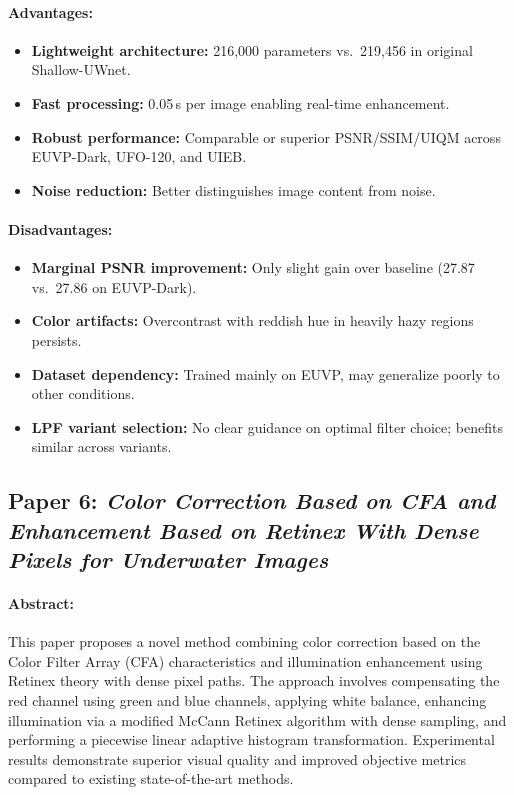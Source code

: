 \documentclass{article}
\begin{document}
\paragraph{Advantages:}
\begin{itemize}
    \item \textbf{Lightweight architecture:} 216,000 parameters vs.\ 219,456 in original Shallow-UWnet.
    \item \textbf{Fast processing:} 0.05\,s per image enabling real-time enhancement.
    \item \textbf{Robust performance:} Comparable or superior PSNR/SSIM/UIQM across EUVP-Dark, UFO-120, and UIEB.
    \item \textbf{Noise reduction:} Better distinguishes image content from noise.
\end{itemize}

\paragraph{Disadvantages:}
\begin{itemize}
    \item \textbf{Marginal PSNR improvement:} Only slight gain over baseline (27.87 vs.\ 27.86 on EUVP-Dark).
    \item \textbf{Color artifacts:} Overcontrast with reddish hue in heavily hazy regions persists.
    \item \textbf{Dataset dependency:} Trained mainly on EUVP, may generalize poorly to other conditions.
    \item \textbf{LPF variant selection:} No clear guidance on optimal filter choice; benefits similar across variants.
\end{itemize}

\subsection{Paper 6: \textit{Color Correction Based on CFA and Enhancement
Based on Retinex With Dense Pixels for
Underwater Images}}

\paragraph{Abstract:}  
This paper proposes a novel method combining color correction based on the Color Filter Array (CFA) characteristics and illumination enhancement using Retinex theory with dense pixel paths. The approach involves compensating the red channel using green and blue channels, applying white balance, enhancing illumination via a modified McCann Retinex algorithm with dense sampling, and performing a piecewise linear adaptive histogram transformation. Experimental results demonstrate superior visual quality and improved objective metrics compared to existing state-of-the-art methods.
\end{document}
